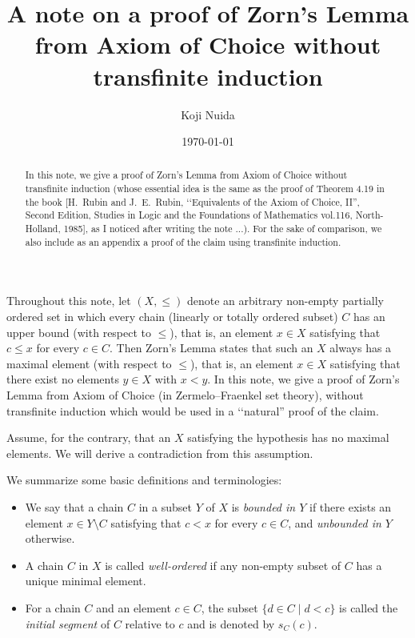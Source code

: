 \documentclass{article}
\title{A note on a proof of Zorn's Lemma from Axiom of Choice without transfinite induction}
\author{Koji Nuida}
\date{\today}
\begin{document}
\maketitle

\begin{abstract}
In this note, we give a proof of Zorn's Lemma from Axiom of Choice without transfinite induction (whose essential idea is the same as the proof of Theorem 4.19 in the book [H.~Rubin and J.~E.~Rubin, \lq\lq Equivalents of the Axiom of Choice, II'', Second Edition, Studies in Logic and the Foundations of Mathematics vol.116, North-Holland, 1985], as I noticed after writing the note ...).
For the sake of comparison, we also include as an appendix a proof of the claim using transfinite induction.
\end{abstract}

Throughout this note, let $(X,\leq)$ denote an arbitrary non-empty partially ordered set in which every chain (linearly or totally ordered subset) $C$ has an upper bound (with respect to $\leq$), that is, an element $x \in X$ satisfying that $c \leq x$ for every $c \in C$.
Then Zorn's Lemma states that such an $X$ always has a maximal element (with respect to $\leq$), that is, an element $x \in X$ satisfying that there exist no elements $y \in X$ with $x < y$.
In this note, we give a proof of Zorn's Lemma from Axiom of Choice (in Zermelo--Fraenkel set theory), without transfinite induction which would be used in a \lq\lq natural'' proof of the claim.

Assume, for the contrary, that an $X$ satisfying the hypothesis has no maximal elements.
We will derive a contradiction from this assumption.

We summarize some basic definitions and terminologies:
\begin{itemize}
\item We say that a chain $C$ in a subset $Y$ of $X$ is \emph{bounded in $Y$} if there exists an element $x \in Y \setminus C$ satisfying that $c < x$ for every $c \in C$, and \emph{unbounded in $Y$} otherwise.
\item A chain $C$ in $X$ is called \emph{well-ordered} if any non-empty subset of $C$ has a unique minimal element.
\item For a chain $C$ and an element $c \in C$, the subset $\{d \in C \mid d < c\}$ is called the \emph{initial segment} of $C$ relative to $c$ and is denoted by $s_C(c)$.
\end{itemize}
\end{document}
